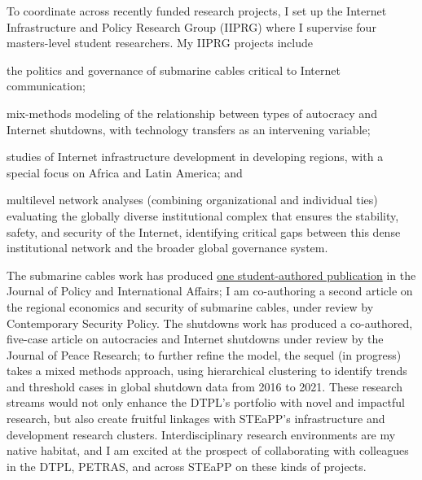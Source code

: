 \documentclass[11pt]{letter}
\begin{document}
\begin{letter}
To coordinate across recently funded research projects, I set up the Internet Infrastructure and Policy Research Group (IIPRG) where I supervise four masters-level student researchers.
%
My IIPRG projects include %
%
\begin{inparaenum}
  \item the politics and governance of submarine cables critical to Internet communication; 
  \item mix-methods modeling of the relationship between types of autocracy and Internet shutdowns, with technology transfers as an intervening variable; 
  \item studies of Internet infrastructure development in developing regions, with a special focus on Africa and Latin America; and 
  \item multilevel network analyses (combining organizational and individual ties) evaluating the globally diverse institutional complex that ensures the stability, safety, and security of the Internet, identifying critical gaps between this dense institutional network and the broader global governance system.
\end{inparaenum}  
%
The submarine cables work has produced \href{https://jpia.princeton.edu/news/leveraging-submarine-cables-political-gain-us-responses-chinese-strategy}{one student-authored publication} in the Journal of Policy and International Affairs; I am co-authoring a second article on the regional economics and security of submarine cables, under review by Contemporary Security Policy.
%
The shutdowns work has produced a co-authored, five-case article on autocracies and Internet shutdowns under review by the Journal of Peace Research; to further refine the model, the sequel (in progress) takes a mixed methods approach, using hierarchical clustering to identify trends and threshold cases in global shutdown data from 2016 to 2021. 
%
These research streams would not only enhance the DTPL's portfolio with novel and impactful research, but also create fruitful linkages with STEaPP's infrastructure and development research clusters.
%
Interdisciplinary research environments are my native habitat, and I am excited at the prospect of collaborating with colleagues in the DTPL, PETRAS, and across STEaPP on these kinds of projects.
% 
%


  


\end{letter}
\end{document}
